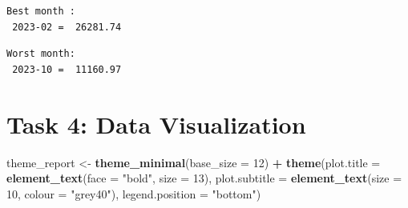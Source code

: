 \documentclass[
]{article}
\newenvironment{Shaded}{\begin{snugshade}}{\end{snugshade}}
\newcommand{\AttributeTok}[1]{\textcolor[rgb]{0.13,0.29,0.53}{#1}}
\newcommand{\DecValTok}[1]{\textcolor[rgb]{0.00,0.00,0.81}{#1}}
\newcommand{\FunctionTok}[1]{\textcolor[rgb]{0.13,0.29,0.53}{\textbf{#1}}}
\newcommand{\NormalTok}[1]{#1}
\newcommand{\OtherTok}[1]{\textcolor[rgb]{0.56,0.35,0.01}{#1}}
\newcommand{\SpecialCharTok}[1]{\textcolor[rgb]{0.81,0.36,0.00}{\textbf{#1}}}
\newcommand{\StringTok}[1]{\textcolor[rgb]{0.31,0.60,0.02}{#1}}
\begin{document}
\begin{Shaded}
\end{Shaded}

\begin{verbatim}
Best month :
 2023-02 =  26281.74 
\end{verbatim}

\begin{Shaded}
\end{Shaded}

\begin{verbatim}
Worst month:
 2023-10 =  11160.97 
\end{verbatim}

\section{Task 4: Data Visualization}\label{task-4-data-visualization}

\begin{Shaded}
\begin{Highlighting}[]
\NormalTok{theme\_report }\OtherTok{\textless{}{-}} \FunctionTok{theme\_minimal}\NormalTok{(}\AttributeTok{base\_size =} \DecValTok{12}\NormalTok{) }\SpecialCharTok{+} \FunctionTok{theme}\NormalTok{(}\AttributeTok{plot.title =} \FunctionTok{element\_text}\NormalTok{(}\AttributeTok{face =} \StringTok{"bold"}\NormalTok{,}
    \AttributeTok{size =} \DecValTok{13}\NormalTok{), }\AttributeTok{plot.subtitle =} \FunctionTok{element\_text}\NormalTok{(}\AttributeTok{size =} \DecValTok{10}\NormalTok{, }\AttributeTok{colour =} \StringTok{"grey40"}\NormalTok{), }\AttributeTok{legend.position =} \StringTok{"bottom"}\NormalTok{)}
\end{Highlighting}
\end{Shaded}
\end{document}
